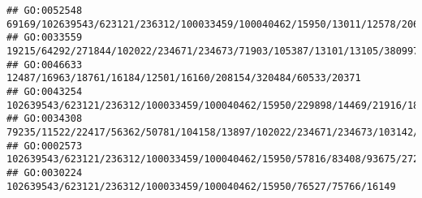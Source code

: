 \documentclass[
]{article}
\begin{document}
\begin{verbatim}
## GO:0052548                                                                                                                                                                                                                                          69169/102639543/623121/236312/100033459/100040462/15950/13011/12578/20617/12047/76884/18053/20701/20704/71907/18095/54483/15160/20861/20862/19876/16912/16913/15511
## GO:0033559                                                                                                                                                                                                                                                                                               19215/64292/271844/102022/234671/234673/71903/105387/13101/13105/380997/223706/631304/13078/16149/72082/433247
## GO:0046633                                                                                                                                                                                                                                                                                                                                                12487/16963/18761/16184/12501/16160/208154/320484/60533/20371
## GO:0043254                                                                                                                                                                                       102639543/623121/236312/100033459/100040462/15950/229898/14469/21916/18386/100038882/56221/20617/75305/93675/20128/67971/14234/17392/50876/76884/327959/78473/20259/20741/54483/15511/193740/224762/22153/225288/12229
## GO:0034308                                                                                                                                                                                                                                                                                                                    79235/11522/22417/56362/50781/104158/13897/102022/234671/234673/103142/105387/58226/13078
## GO:0002573                                                                                                                                                                                                                                              102639543/623121/236312/100033459/100040462/15950/57816/83408/93675/272382/76527/16160/20304/12775/13386/16364/21943/321019/75766/24108/12326/16149/74481/17986
## GO:0030224                                                                                                                                                                                                                                                                                                                                          102639543/623121/236312/100033459/100040462/15950/76527/75766/16149

\end{verbatim}
\end{document}
